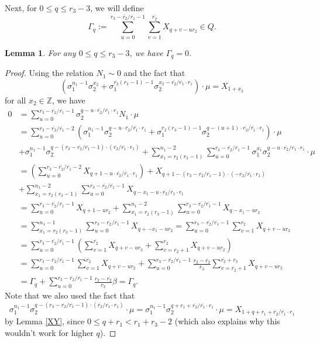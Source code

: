 \documentclass[12pt,a4paper]{article}
\newtheorem{lemma}[theorem]{Lemma}
\theoremstyle{definition}
\newcommand{\Z}{\mathbb{Z}}
\newcommand{\uo}{\overline{r_2}}
\newcommand{\vo}{\overline{r_1}}
\begin{document}
Next, for $0\leq q \leq r_3-3$, we will define $$\Gamma_q:=\sum_{u=0}^{r_3-\uo/\vo-1}\sum_{v=1}^{\uo}X_{q+v-ur_2}\in Q.$$

\begin{lemma}
For any $0\leq q \leq r_3-3$, we have $\Gamma_q=0$.
\end{lemma}
\begin{proof}
Using the relation $N_1\sim 0$ and the fact that $$(\sigma_1^{n_1-1}\sigma_2^{x_2}+\sigma_1^{r_2(r_3-1)-1}\sigma_2^{x_2-\uo/\vo\cdot r_1})\cdot \mu=X_{1+x_2}$$ for all $x_2\in\Z$, we have 
\begin{align*}
0&= \sum_{u=0}^{r_3-\uo/\vo-1} \sigma_2^{q-u\cdot\uo/\vo\cdot r_1}N_1\cdot \mu\\
&= \sum_{u=0}^{r_3-\uo/\vo-2} \left( \sigma_1^{n_1-1}\sigma_2^{q-u\cdot\uo/\vo\cdot r_1} +\sigma_1^{r_2(r_3-1)-1}\sigma_2^{q-(u+1)\cdot\uo/\vo\cdot r_1} \right)\cdot \mu\\
&+\sigma_1^{n_1-1}\sigma_2^{q-(r_3-\uo/\vo-1)\cdot (\uo/\vo\cdot r_1)}+
\sum_{x_1=r_2(r_3-1)}^{n_1-2}\sum_{u=0}^{r_3-\uo/\vo-1} \sigma_1^{x_1}\sigma_2^{q-u\cdot\uo/\vo\cdot r_1}\cdot \mu\\
&= \left(\sum_{u=0}^{r_3-\uo/\vo-2} X_{q+1-u\cdot\uo/\vo\cdot r_1}\right)+X_{q+1-(r_3-\uo/\vo-1)\cdot (-\uo/\vo\cdot r_1)}\\
&+\sum_{x_1=r_2(r_3-1)}^{n_1-2}\sum_{u=0}^{r_3-\uo/\vo-1} X_{q-x_1-u\cdot\uo/\vo\cdot r_1}\\
&=\sum_{u=0}^{r_3-\uo/\vo-1} X_{q+1-ur_2}+\sum_{x_1=r_2(r_3-1)}^{n_1-2}\sum_{u=0}^{r_3-\uo/\vo-1} X_{q-x_1-ur_2}\\
&=\sum_{x_1=r_2(r_3-1)}^{n_1-1}\sum_{u=0}^{r_3-\uo/\vo-1} X_{q+-x_1-ur_2}=\sum_{u=0}^{r_3-\uo/\vo-1} \sum_{v=1}^{r_2} X_{q+v-ur_2}\\
&=\sum_{u=0}^{r_3-\uo/\vo-1} \left(\sum_{v=1}^{\overline{r_2}} X_{q+v-ur_2}+\sum_{v=\overline{r_2}+1}^{r_2} X_{q+v-ur_2}\right)\\
&=\sum_{u=0}^{r_3-\uo/\vo-1} \sum_{v=1}^{\overline{r_2}} X_{q+v-ur_2}+\sum_{u=0}^{r_3-\uo/\vo-1}\frac{r_2-\overline{r_2}}{r_3}\sum_{v=\overline{r_2}+1}^{\overline{r_2}+r_3} X_{q+v-ur_2}\\
&=\Gamma_q+\sum_{u=0}^{r_3-\uo/\vo-1}\frac{r_2-\overline{r_2}}{r_3}\beta=\Gamma_q.
\end{align*}
Note that we also used the fact that 
$$\sigma_1^{n_1-1}\sigma_2^{q-(r_3-\uo/\vo-1)\cdot (\uo/\vo\cdot r_1)}\cdot \mu =\sigma_1^{n_1-1}\sigma_2^{q+r_1+\uo/\vo\cdot r_1}\cdot \mu=X_{1+q+r_1+\uo/\vo\cdot r_1}$$
by Lemma \ref{XY}, since $0\leq q+r_1<r_1+r_3-2$ (which also explains why this wouldn't work for higher $q$).

\end{proof}
\end{document}
